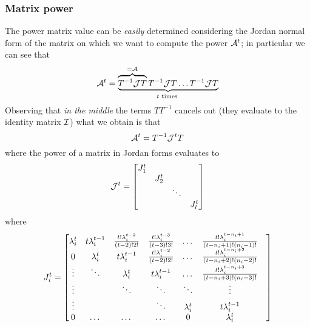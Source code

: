 	\subsubsection{Matrix power}
		The power matrix value can be \textit{easily} determined considering the Jordan normal form of the matrix on which we want to compute the power $\mathcal{A}^t$; in particular we can see that
		\[ \mathcal{A}^ t = \underbrace{ \overbrace{T^{-1} \mathcal{J} T}^{=\mathcal{A}}  T^{-1} \mathcal{J} T \dots T^{-1} \mathcal{J} T }_{t \textrm{ times } }  \]
		Observing that \textit{in the middle} the terms $T T^{-1}$ cancels out (they evaluate to the identity matrix $\mathcal{I}$) what we obtain is that
		\begin{equation} \label{eq:lin:powermatrix}
			\mathcal{A}^t = T^{-1} \mathcal{J}^t T
		\end{equation}
		where the power of a matrix in Jordan forms evaluates to
		\begin{equation} \label{eq:lin:Ji}
			\mathcal{J}^t = \begin{bmatrix} J_1^t \\ & J_2^t \\ && \ddots \\ &&& J_l^t \end{bmatrix}
		\end{equation} 
		where
		\begin{equation} J_i^t = \begin{bmatrix}  
			\lambda_i^t & t \lambda_i^{t-1} & \frac{t! \lambda_i^{t-2 }}{(t-2)! 2!} & \frac{t! \lambda_i^{t-3 }}{(t-3)! 3!} & \dots & \frac{t! \lambda_i^{t-n_i+1}}{(t-n_i+1)!(n_i-1)!} \\
			0&\lambda_i^t & t \lambda_i^{t-1} &  \frac{t! \lambda_i^{t-2 }}{(t-2)! 2!} &  \dots & \frac{t! \lambda_i^{t-n_i+2}}{(t-n_i+2)!(n_i-2)!}\\
			\vdots & \ddots &\lambda_i^t &  t \lambda_i^{t-1} & \dots & \frac{t! \lambda_i^{t-n_i+3}}{(t-n_i+3)!(n_i-3)!} \\
			\vdots && \ddots & \ddots & \ddots & \vdots\\
			\vdots&&& \ddots &\lambda_i^t &  t \lambda_i^{t-1} &\\
			0& \dots& \dots & \dots& 0&\lambda_i^t &  \\			
		  \end{bmatrix} \end{equation}
		
